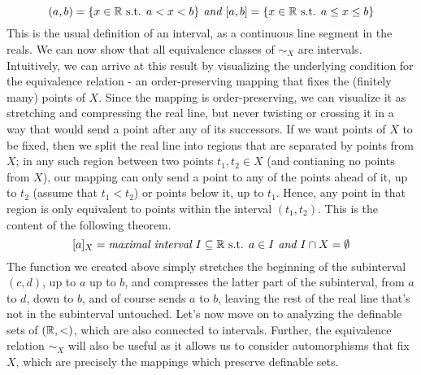 \documentclass{article}
\begin{document}
    $$ (a, b) = \{ x \in \mathbb{R} \textnormal{ s.t. } a < x < b \} \textit{ and } [a, b] = \{ x \in \mathbb{R} \textnormal{ s.t. } a \leq x \leq b \} $$
This is the usual definition of an interval, as a continuous line segment in the reals. We can now show that all equivalence classes of $ \sim_X $ are intervals. Intuitively, we can arrive at this result by visualizing the underlying condition for the equivalence relation - an order-preserving mapping that fixes the (finitely many) points of $ X $. Since the mapping is order-preserving, we can visualize it as stretching and compressing the real line, but never twisting or crossing it in a way that would send a point after any of its successors. If we want points of $ X $ to be fixed, then we split the real line into regions that are separated by points from $ X $; in any such region between two points $ t_1, t_2 \in X $ (and contianing no points from $ X $), our mapping can only send a point to any of the points ahead of it, up to $ t_2 $ (assume that $ t_1 < t_2 $) or points below it, up to $ t_1 $. Hence, any point in that region is only equivalent to points within the interval $ (t_1, t_2) $. This is the content of the following theorem.
    $$ [a]_X = \textit{maximal interval $ I \subseteq \mathbb{R} $} \textnormal{ s.t. } a \in I \textit{ and } I \cap X = \emptyset $$
The function we created above simply stretches the beginning of the subinterval $ (c, d) $, up to $ a $ up to $ b $, and compresses the latter part of the subinterval, from $ a $ to $ d $, down to $ b $, and of course sends $ a $ to $ b $, leaving the rest of the real line that's not in the subinterval untouched. Let's now move on to analyzing the definable sets of $ (\mathbb{R}, <) $, which are also connected to intervals. Further, the equivalence relation $ \sim_X $ will also be useful as it allows us to consider automorphisms that fix $ X $, which are precisely the mappings which preserve definable sets.
\end{document}
